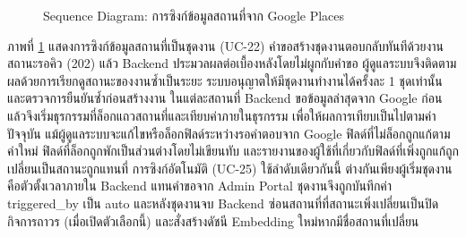 \begin{figure}[H]
\centering
{}
\caption{Sequence Diagram: การซิงก์ข้อมูลสถานที่จาก Google Places}
\label{fig:sequence_place_sync}
\end{figure}

ภาพที่ \ref{fig:sequence_place_sync} แสดงการซิงก์ข้อมูลสถานที่เป็นชุดงาน (UC-22) คำขอสร้างชุดงานตอบกลับทันทีด้วยงานสถานะรอคิว (202) แล้ว Backend ประมวลผลต่อเบื้องหลังโดยไม่ผูกกับคำขอ ผู้ดูแลระบบจึงติดตามผลด้วยการเรียกดูสถานะของงานซ้ำเป็นระยะ ระบบอนุญาตให้มีชุดงานทำงานได้ครั้งละ 1 ชุดเท่านั้น และตรวจการยืนยันซ้ำก่อนสร้างงาน ในแต่ละสถานที่ Backend ขอข้อมูลล่าสุดจาก Google ก่อนแล้วจึงเริ่มธุรกรรมที่ล็อกแถวสถานที่และเทียบค่าภายในธุรกรรม เพื่อให้ผลการเทียบเป็นไปตามค่าปัจจุบัน แม้ผู้ดูแลระบบจะแก้ไขหรือล็อกฟิลด์ระหว่างรอคำตอบจาก Google ฟิลด์ที่ไม่ล็อกถูกแก้ตามค่าใหม่ ฟิลด์ที่ล็อกถูกพักเป็นส่วนต่างโดยไม่เขียนทับ และรายงานของผู้ใช้ที่เกี่ยวกับฟิลด์ที่เพิ่งถูกแก้ถูกเปลี่ยนเป็นสถานะถูกแทนที่ การซิงก์อัตโนมัติ (UC-25) ใช้ลำดับเดียวกันนี้ ต่างกันเพียงผู้เริ่มชุดงานคือตัวตั้งเวลาภายใน Backend แทนคำขอจาก Admin Portal ชุดงานจึงถูกบันทึกค่า triggered\_by เป็น auto และหลังชุดงานจบ Backend ซ่อนสถานที่ที่สถานะเพิ่งเปลี่ยนเป็นปิดกิจการถาวร (เมื่อเปิดตัวเลือกนี้) และสั่งสร้างดัชนี Embedding ใหม่หากมีชื่อสถานที่เปลี่ยน

